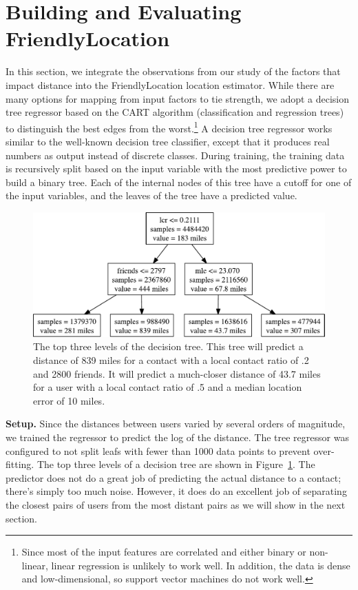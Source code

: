 \documentclass[letterpaper]{article}
\begin{document}
\section{Building and Evaluating FriendlyLocation}

In this section, we integrate the observations from our study of the factors
that impact distance into the FriendlyLocation location estimator.
%
While there are many options for mapping from input factors to tie strength, we
adopt a decision tree regressor based on the CART algorithm (classification and
regression trees) to distinguish the best edges from the worst.\footnote{Since
    most of the input features are correlated and either binary or non-linear,
    linear regression is unlikely to work well.
    In addition, the data is dense and low-dimensional, so support vector machines
    do not work well.}
%
A decision tree regressor works similar to the well-known decision tree
classifier, except that it produces real numbers as output instead of discrete
classes.
%
During training, the training data is recursively split based on the input
variable with the most predictive power to build a binary tree.
%
Each of the internal nodes of this tree have a cutoff for one of the input
variables, and the leaves of the tree have a predicted value.


\begin{figure}[tb]
\centering
\includegraphics[width=.8\linewidth]{figures/tree_top.pdf}
\caption{
    The top three levels of the decision tree. This tree will predict a
    distance of 839 miles for a contact with a local contact ratio of .2 and
    2800 friends. It will predict a much-closer distance of 43.7 miles for a
    user with a local contact ratio of .5 and a median location error of 10
    miles.
}
\label{fig:TreeTop}
\vspace{-2pt}
\end{figure}

\noindent\textbf{Setup.} Since the distances between users varied by several
orders of magnitude, we trained the regressor to predict the log of the
distance.
%
The tree regressor was configured to not split leafs with fewer than 1000 data
points to prevent over-fitting.
%
The top three levels of a decision tree are shown in Figure~\ref{fig:TreeTop}.
%
The predictor does not do a great job of predicting the actual distance to a
contact; there's simply too much noise.
%
However, it does do an excellent job of separating the closest pairs of users
from the most distant pairs as we will show in the next section.
\end{document}
